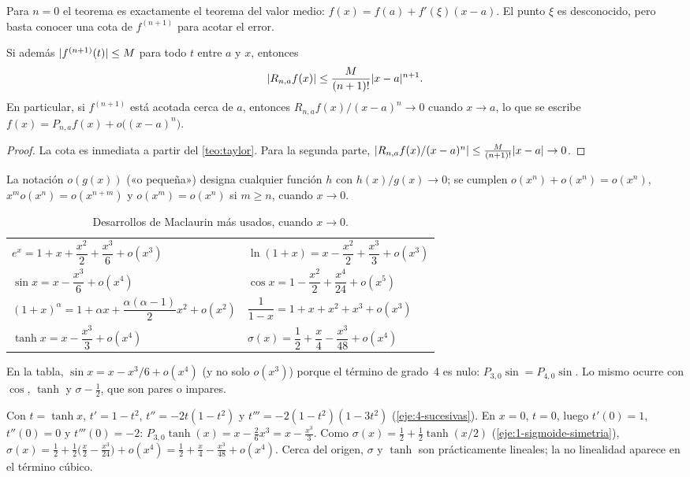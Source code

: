 Para $n=0$ el teorema es exactamente el teorema del valor medio: $f(x)=f(a)+f'(\xi)(x-a)$. El punto $\xi$ es desconocido, pero basta conocer una cota de $f^{(n+1)}$ para acotar el error.

\begin{corolario}\label{cor:cota}
Si además $\lvert f^{(n+1)}(t)\rvert\le M$ para todo $t$ entre $a$ y $x$, entonces
\[
\lvert R_{n,a}f(x)\rvert\le\frac{M}{(n+1)!}\lvert x-a\rvert^{n+1}.
\]
En particular, si $f^{(n+1)}$ está acotada cerca de $a$, entonces $R_{n,a}f(x)/(x-a)^{n}\to0$ cuando $x\to a$, lo que se escribe $f(x)=P_{n,a}f(x)+o\bigl((x-a)^{n}\bigr)$.
\end{corolario}

\begin{proof}
La cota es inmediata a partir del \cref{teo:taylor}. Para la segunda parte, $\lvert R_{n,a}f(x)/(x-a)^{n}\rvert\le\frac{M}{(n+1)!}\lvert x-a\rvert\to0$.
\end{proof}

La notación $o(g(x))$ («o pequeña») designa cualquier función $h$ con $h(x)/g(x)\to0$; se cumplen $o(x^{n})+o(x^{n})=o(x^{n})$, $x^{m}o(x^{n})=o(x^{n+m})$ y $o(x^{m})=o(x^{n})$ si $m\ge n$, cuando $x\to0$.

\begin{table}[h]
\centering\small
\caption{Desarrollos de Maclaurin más usados, cuando $x\to0$.}\label{tab:maclaurin}
\begin{tabular}{@{}ll@{}}
\toprule
$e^{x}=1+x+\dfrac{x^{2}}{2}+\dfrac{x^{3}}{6}+o(x^{3})$ & $\ln(1+x)=x-\dfrac{x^{2}}{2}+\dfrac{x^{3}}{3}+o(x^{3})$ \\[2mm]
$\sin x=x-\dfrac{x^{3}}{6}+o(x^{4})$ & $\cos x=1-\dfrac{x^{2}}{2}+\dfrac{x^{4}}{24}+o(x^{5})$ \\[2mm]
$(1+x)^{\alpha}=1+\alpha x+\dfrac{\alpha(\alpha-1)}{2}x^{2}+o(x^{2})$ & $\dfrac{1}{1-x}=1+x+x^{2}+x^{3}+o(x^{3})$ \\[2mm]
$\tanh x=x-\dfrac{x^{3}}{3}+o(x^{4})$ & $\sigma(x)=\dfrac12+\dfrac{x}{4}-\dfrac{x^{3}}{48}+o(x^{4})$ \\
\bottomrule
\end{tabular}
\end{table}

En la tabla, $\sin x=x-x^{3}/6+o(x^{4})$ (y no solo $o(x^{3})$) porque el término de grado~4 es nulo: $P_{3,0}\sin=P_{4,0}\sin$. Lo mismo ocurre con $\cos$, $\tanh$ y $\sigma-\tfrac12$, que son pares o impares.

\begin{ejemplo}\label{ej:taylor-activaciones}
Con $t=\tanh x$, $t'=1-t^{2}$, $t''=-2t(1-t^{2})$ y $t'''=-2(1-t^{2})(1-3t^{2})$ (\cref{eje:4-sucesivas}). En $x=0$, $t=0$, luego $t'(0)=1$, $t''(0)=0$ y $t'''(0)=-2$: $P_{3,0}\tanh(x)=x-\frac{2}{6}x^{3}=x-\frac{x^{3}}{3}$. Como $\sigma(x)=\tfrac12+\tfrac12\tanh(x/2)$ (\cref{eje:1-sigmoide-simetria}), $\sigma(x)=\tfrac12+\tfrac12\bigl(\tfrac x2-\tfrac{x^{3}}{24}\bigr)+o(x^{4})=\tfrac12+\tfrac x4-\tfrac{x^{3}}{48}+o(x^{4})$. Cerca del origen, $\sigma$ y $\tanh$ son prácticamente lineales; la no linealidad aparece en el término cúbico.
\end{ejemplo}

